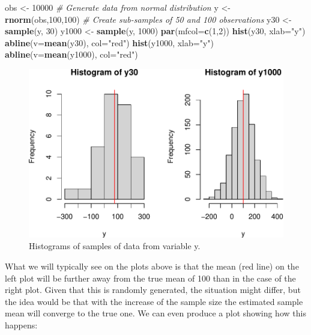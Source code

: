 \documentclass[
]{book}
\newenvironment{Shaded}{\begin{snugshade}}{\end{snugshade}}
\newcommand{\AttributeTok}[1]{\textcolor[rgb]{0.13,0.29,0.53}{#1}}
\newcommand{\CommentTok}[1]{\textcolor[rgb]{0.56,0.35,0.01}{\textit{#1}}}
\newcommand{\DecValTok}[1]{\textcolor[rgb]{0.00,0.00,0.81}{#1}}
\newcommand{\FunctionTok}[1]{\textcolor[rgb]{0.13,0.29,0.53}{\textbf{#1}}}
\newcommand{\NormalTok}[1]{#1}
\newcommand{\OtherTok}[1]{\textcolor[rgb]{0.56,0.35,0.01}{#1}}
\newcommand{\StringTok}[1]{\textcolor[rgb]{0.31,0.60,0.02}{#1}}
\theoremstyle{definition}
\theoremstyle{definition}
\theoremstyle{definition}
\theoremstyle{definition}
\theoremstyle{remark}
\begin{document}
\begin{Shaded}
\begin{Highlighting}[]
\NormalTok{obs }\OtherTok{\textless{}{-}} \DecValTok{10000}
\CommentTok{\# Generate data from normal distribution}
\NormalTok{y }\OtherTok{\textless{}{-}} \FunctionTok{rnorm}\NormalTok{(obs,}\DecValTok{100}\NormalTok{,}\DecValTok{100}\NormalTok{)}
\CommentTok{\# Create sub{-}samples of 50 and 100 observations}
\NormalTok{y30 }\OtherTok{\textless{}{-}} \FunctionTok{sample}\NormalTok{(y, }\DecValTok{30}\NormalTok{)}
\NormalTok{y1000 }\OtherTok{\textless{}{-}} \FunctionTok{sample}\NormalTok{(y, }\DecValTok{1000}\NormalTok{)}
\FunctionTok{par}\NormalTok{(}\AttributeTok{mfcol=}\FunctionTok{c}\NormalTok{(}\DecValTok{1}\NormalTok{,}\DecValTok{2}\NormalTok{))}
\FunctionTok{hist}\NormalTok{(y30, }\AttributeTok{xlab=}\StringTok{"y"}\NormalTok{)}
\FunctionTok{abline}\NormalTok{(}\AttributeTok{v=}\FunctionTok{mean}\NormalTok{(y30), }\AttributeTok{col=}\StringTok{"red"}\NormalTok{)}
\FunctionTok{hist}\NormalTok{(y1000, }\AttributeTok{xlab=}\StringTok{"y"}\NormalTok{)}
\FunctionTok{abline}\NormalTok{(}\AttributeTok{v=}\FunctionTok{mean}\NormalTok{(y1000), }\AttributeTok{col=}\StringTok{"red"}\NormalTok{)}
\end{Highlighting}
\end{Shaded}

\begin{figure}
\centering
\includegraphics{Svetunkov---Statistics-for-Business-Analytics_files/figure-latex/histY30Y1000-1.pdf}
\caption{\label{fig:histY30Y1000}Histograms of samples of data from variable y.}
\end{figure}

What we will typically see on the plots above is that the mean (red line) on the left plot will be further away from the true mean of 100 than in the case of the right plot. Given that this is randomly generated, the situation might differ, but the idea would be that with the increase of the sample size the estimated sample mean will converge to the true one. We can even produce a plot showing how this happens:
\end{document}
